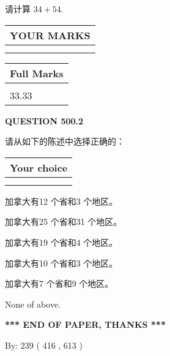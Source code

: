 \documentclass{ctexart}
\begin{document}
  
 
请计算 $ %
34 +  %
54 $.
 

 

 
  
\vspace{0.2in}
  
\noindent\begin{tabular}{|l|}
\hline
 YOUR MARKS  \\
\hline
 \\ 
 \\ 
\hline
\end{tabular}
\hspace{0.05in} \begin{tabular}{|l|}
\hline
 Full Marks  \\
\hline
 \\ 
33.33 \\
\hline
\end{tabular}
{\textbf{\Large{QUESTION
500.2 
}}}
  
  
请从如下的陈述中选择正确的：
  
  
\noindent\hspace{3.0in} \begin{tabular}{|l|}
\hline
Your choice \\
\hline
 \\ 
 \\ 
\hline
\end{tabular}
  
  
 
 
加拿大有12 个省和3 个地区。
 
 
加拿大有25 个省和31 个地区。
 
 
加拿大有19 个省和4 个地区。
 
 
加拿大有10 个省和3 个地区。
 
 
加拿大有7 个省和9 个地区。
 
 
 None of above.
 
 
   
   
 \vspace{0.2in}
 
   
   
   
   
\vspace{1.0in} 
{\textbf{\large{ *** END OF PAPER, THANKS *** }}} 
   
   
\hspace{1.0in} By: 
 239 ( 416 ,  613 )
   
\end{document}
